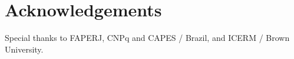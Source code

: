 \section*{Acknowledgements}
Special thanks to FAPERJ, CNPq and CAPES / Brazil, and ICERM / Brown University.

\mainmatter
\fancyhead[LE]{\nouppercase{\leftmark}}
\fancyhead[RE]{\thepage}
\fancyhead[LO]{\nouppercase{\rightmark}}
\fancyhead[RO]{\thepage}





%

%



